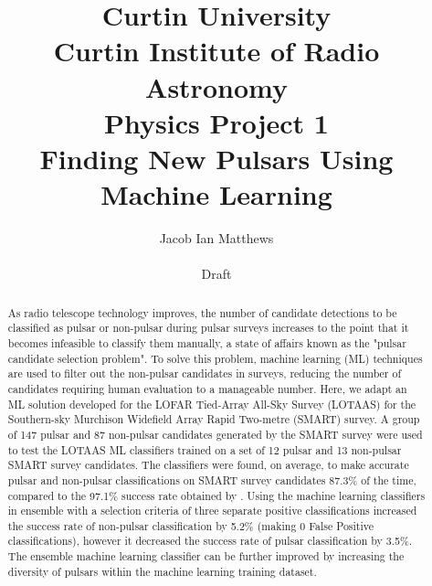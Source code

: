 \documentclass{article}
\title{\large{Curtin University} \\ \large{Curtin Institute of Radio Astronomy} \\ \large{Physics Project 1} \\ \vspace*{20px} \textbf{\LARGE{Finding New Pulsars Using Machine Learning}}\vspace*{10px}}
\author{\vspace*{20px} Jacob Ian Matthews \\ \\ Draft}
\begin{document}
\begin{titlepage}
    
    \maketitle
    
    \vspace*{20px}

    \begin{abstract}

        As radio telescope technology improves, the number of candidate detections to be classified as pulsar or non-pulsar during pulsar surveys increases to the point that it becomes infeasible to classify them manually, a state of affairs known as the "pulsar candidate selection problem". To solve this problem, machine learning (ML) techniques are used to filter out the non-pulsar candidates in surveys, reducing the number of candidates requiring human evaluation to a manageable number. Here, we adapt an ML solution developed for the LOFAR Tied-Array All-Sky Survey (LOTAAS) for the Southern-sky Murchison Widefield Array Rapid Two-metre (SMART) survey. A group of 147 pulsar and 87 non-pulsar candidates generated by the SMART survey were used to test the LOTAAS ML classifiers trained on a set of 12 pulsar and 13 non-pulsar SMART survey candidates. The classifiers were found, on average, to make accurate pulsar and non-pulsar classifications on SMART survey candidates 87.3\% of the time, compared to the 97.1\% success rate obtained by \textcite{lyon}. Using the machine learning classifiers in ensemble with a selection criteria of three separate positive classifications increased the success rate of non-pulsar classification by 5.2\% (making 0 False Positive classifications), however it decreased the success rate of pulsar classification by 3.5\%. The ensemble machine learning classifier can be further improved by increasing the diversity of pulsars within the machine learning training dataset.

    \end{abstract}



\end{titlepage}

\pagebreak

\tableofcontents

\pagebreak


\end{document}
